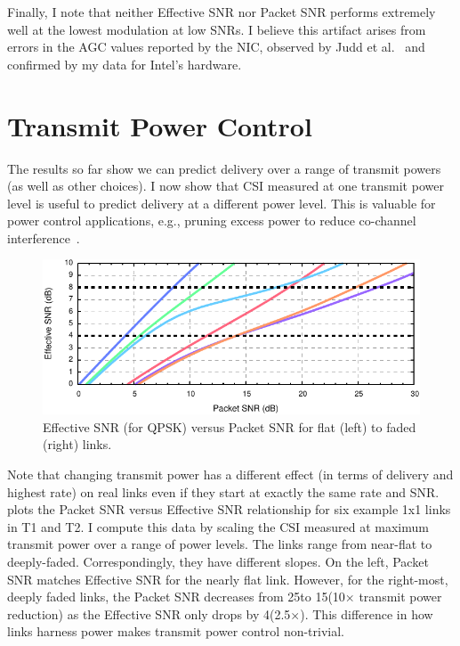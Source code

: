 Finally, I note that neither Effective SNR nor Packet SNR performs extremely well at the lowest modulation at low SNRs. I believe this artifact arises from errors in the AGC values reported by the NIC, observed by Judd et al.~\cite{Judd_CHARM} and confirmed by my data for Intel's hardware.

\section{Transmit Power Control}
\label{sec:tx_power_trim}
The results so far show we can predict delivery over a range of transmit powers (as well as other choices). I now show that CSI measured at one transmit power level is useful to predict delivery at a different power level. This is valuable for power control applications, e.g., pruning excess power to reduce co-channel interference~\cite{Monks_PowerMAC,Ramachandran_Symphony,Son_PowerStudy}. 

\begin{figure}[t]
  \centering
  \includegraphics[width=\textwidth]{figures/eff_vs_snr_qpsk.pdf}
  \caption{Effective SNR (for QPSK) versus Packet SNR for flat (left) to faded (right) links.}
  \label{fig:eff_vs_rssi}
\end{figure}

Note that changing transmit power has a different effect (in terms of delivery and highest rate) on real links even if they start at exactly the same rate and SNR.  plots the Packet SNR versus Effective SNR relationship for six example 1x1 links in T1 and T2.
I compute this data by scaling the CSI measured at maximum transmit power over a range of power levels.
The links range from near-flat to deeply-faded. Correspondingly, they have different slopes. On the left, Packet SNR matches Effective SNR for the nearly flat link. 
However, for the right-most, deeply faded links, the Packet SNR decreases from 25\dB to 15\dB (10$\times$ transmit power reduction) as the Effective SNR only drops by 4\dB (2.5$\times$). This difference in how links harness power makes transmit power control non-trivial.


